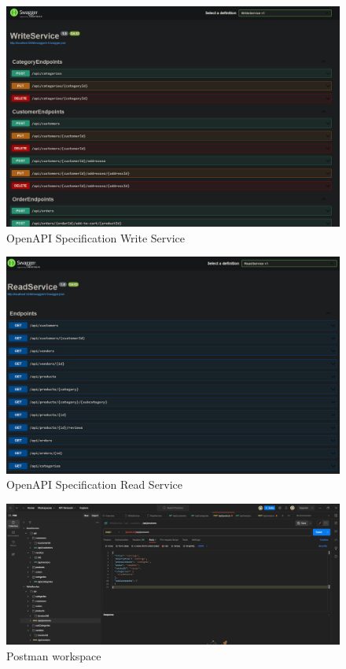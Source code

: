\documentclass[12pt,english]{article}
\begin{document}
\begin{figure}[tbhp]
    \centering
    \includegraphics[scale=0.35]{images/swagger-write.PNG}
    \caption{OpenAPI Specification Write Service}
\end{figure}
\newpage
\begin{figure}[tbhp]
    \centering
    \includegraphics[scale=0.35]{images/swagger-read.PNG}
    \caption{OpenAPI Specification Read Service}
\end{figure}

\begin{figure}[tbhp]
    \centering
    \includegraphics[scale=0.35]{images/postman.PNG}
    \caption{Postman workspace}
\end{figure}
\end{document}
